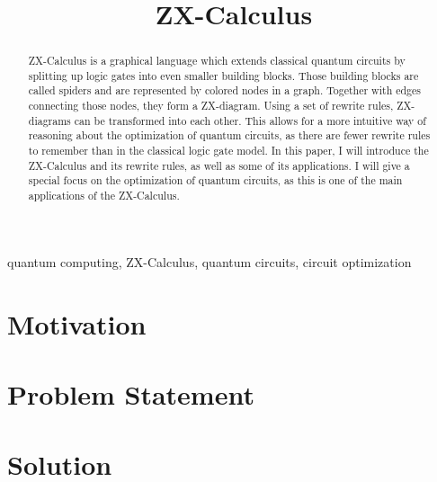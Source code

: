 \documentclass[conference]{IEEEtran}
\begin{document}


\tableofcontents

\title{ZX-Calculus}

\author{
}

\maketitle

\begin{abstract}
    ZX-Calculus is a graphical language which extends classical quantum circuits by splitting up logic gates into even smaller building blocks. Those building blocks are called spiders and are represented by colored nodes in a graph. Together with edges connecting those nodes, they form a ZX-diagram. Using a set of rewrite rules, ZX-diagrams can be transformed into each other. This allows for a more intuitive way of reasoning about the optimization of quantum circuits, as there are fewer rewrite rules to remember than in the classical logic gate model. In this paper, I will introduce the ZX-Calculus and its rewrite rules, as well as some of its applications. I will give a special focus on the optimization of quantum circuits, as this is one of the main applications of the ZX-Calculus.
\end{abstract}

\begin{IEEEkeywords}
    quantum computing, ZX-Calculus, quantum circuits, circuit optimization
\end{IEEEkeywords}









\section{Motivation}


\section{Problem Statement}

\section{Solution}
\end{document}
